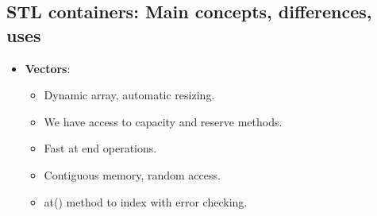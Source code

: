 \documentclass{report}
\begin{document}
   \subsection{STL containers: Main concepts, differences, uses}
   \begin{itemize}
       \item \textbf{Vectors}: 
           \begin{itemize}
               \item Dynamic array, automatic resizing. 
               \item We have access to capacity and reserve methods. 
               \item Fast at end operations. 
               \item Contiguous memory, random access. 
               \item at() method to index with error checking.
           \end{itemize}


\end{itemize}
\end{document}

